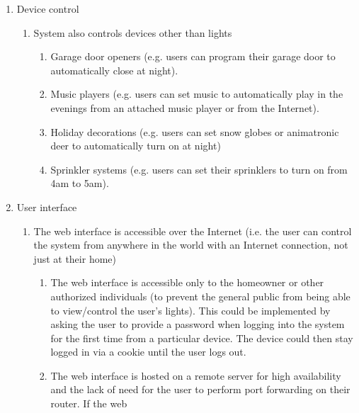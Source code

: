 \begin{enumerate}[resume]
    \item Device control
        \begin{enumerate}
            \item System also controls devices other than lights
                \begin{enumerate}
                    \item Garage door openers (e.g. users can program their
                        garage door to automatically close at night).
                    \item Music players (e.g. users can set music to
                        automatically play in the evenings from an attached
                        music player or from the Internet).
                    \item Holiday decorations (e.g. users can set snow globes
                        or animatronic deer to automatically turn on at night)
                    \item Sprinkler systems (e.g. users can set their
                        sprinklers to turn on from 4am to 5am).
                \end{enumerate}
        \end{enumerate}
    \item User interface
        \begin{enumerate}
            \item The web interface is accessible over the Internet (i.e. the
                user can control the system from anywhere in the world with an
                Internet connection, not just at their home)
                \begin{enumerate}
                    \item The web interface is accessible only to the homeowner
                        or other authorized individuals (to prevent the general
                        public from being able to view/control the user's
                        lights).  This could be implemented by asking the user
                        to provide a password when logging into the system for
                        the first time from a particular device.  The device
                        could then stay logged in via a cookie until the user
                        logs out.
                    \item The web interface is hosted on a remote server for
                        high availability and the lack of need for the user to
                        perform port forwarding on their router.  If the web

\end{enumerate}
\end{enumerate}
\end{enumerate}
